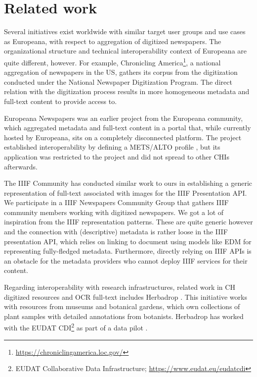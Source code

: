 \documentclass[a4paper,UKenglish,cleveref, autoref]{oasics-v2019}
\begin{document}
\section{Related work}
\label{sec:relatedwork}

Several initiatives exist worldwide with similar target user groups and use cases as Europeana, with respect to aggregation of digitized newspapers. The organizational structure and technical interoperability context of Europeana are quite different, however. For example, Chronicling 
America\footnote{\url{https://chroniclingamerica.loc.gov/}}, a national aggregation of newspapers in the US, gathers its corpus from the digitization conducted under the National Newspaper Digitization Program. The direct relation with the digitization process results in more homogeneous metadata and full-text content to provide access to.

Europeana Newspapers \cite{Dunning15} was an earlier project from the Europeana community, which aggregated metadata and full-text content in a portal that, while currently hosted by Europeana, sits on a completely disconnected platform. The project established interoperability by defining a METS/ALTO profile \cite{Muehlberger14}, but its application was restricted to the project and did not spread to other CHIs afterwards.

The IIIF Community has conducted similar work to ours in establishing a generic representation of full-text associated with images for the IIIF Presentation API. We participate in a IIIF Newspapers Community Group that gathers IIIF community members working with digitized newspapers. We got a lot of inspiration from the IIIF representation patterns. These are quite generic however and the connection with (descriptive) metadata is rather loose in the IIIF presentation API, which relies on linking to document using models like EDM for representing fully-fledged metadata. Furthermore, directly relying on IIIF APIs is an obstacle for the metadata providers who cannot deploy IIIF services for their content.

Regarding interoperability with research infrastructures, related work in CH digitized resources and OCR full-text includes Herbadrop \cite{Dugenie2017}. This initiative works with resources from museums and botanical gardens, which own collections of plant samples with detailed annotations from botanists. Herbadrop has worked with the EUDAT 
CDI\footnote{EUDAT Collaborative Data Infrastructure; \url{https://www.eudat.eu/eudatcdi}}
as part of a data pilot \cite{Dugenie2017}. 
\end{document}
